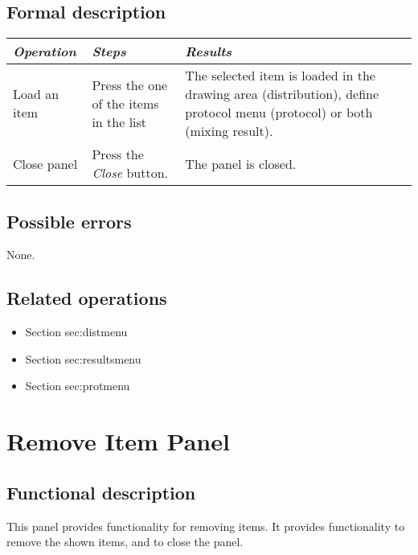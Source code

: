   \subsection*{Formal description}
    \begin{tabularx}{\textwidth}{XXX}
    \toprule
    \emph{Operation} & \emph{Steps} & \emph{Results} \\
    \midrule
    Load an item & Press the one of the items in the list & The selected item is loaded in the drawing area (distribution), define protocol menu (protocol) or both (mixing result). \\
    \midrule
    Close panel & Press the \emph{Close} button. & The panel is closed. \\
    \bottomrule
\end{tabularx}

  \subsection*{Possible errors}
  None.

  \subsection*{Related operations}
   \begin{itemize}
   \item Section {sec:distmenu}
   \item Section {sec:resultsmenu}
   \item Section {sec:protmenu}
  \end{itemize}

\section{Remove Item Panel}
\label{sec:removeitem}
  \subsection*{Functional description}
  This panel provides functionality for removing items. It provides functionality to remove the shown items, and to close the panel.

